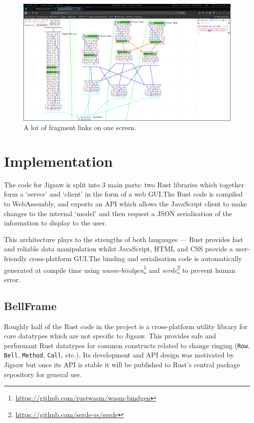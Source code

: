 \documentclass[12pt]{article}
\newcommand{\footurl}[1]{\footnote{\url{#1}}}
\begin{document}
\begin{figure}[h!]
    \centering
    \includegraphics[width=\textwidth]{linking-insane}
    \caption{A lot of fragment links on one screen.}\label{fig:linking-insane}
\end{figure}



\pagebreak

\section{Implementation}

The code for Jigsaw is split into 3 main parts: two Rust libraries which together form a `server'
and `client' in the form of a web GUI.\@  The Rust code is compiled to WebAssembly, and exports an
API which allows the JavaScript client to make changes to the internal `model' and then request a
JSON serialisation of the information to display to the user.

This architecture plays to the strengths of both languages --- Rust provides fast and reliable data
manipulation whilst JavaScript, HTML and CSS provide a user-friendly cross-platform GUI.\@  The
binding and serialisation code is automatically generated at compile time using
\emph{wasm-bindgen}\footurl{https://github.com/rustwasm/wasm-bindgen} and
\emph{serde}\footurl{https://github.com/serde-rs/serde} to prevent human error.

\subsection{BellFrame}

Roughly half of the Rust code in the project is a cross-platform utility library for core datatypes
which are not specific to Jigsaw.  This provides safe and performant Rust datatypes for common
constructs related to change ringing (\verb|Row|, \verb|Bell|, \verb|Method|, \verb|Call|, etc.).
Its development and API design was motivated by Jigsaw but once its API is stable it will be
published to Rust's central package repository for general use.
\end{document}
